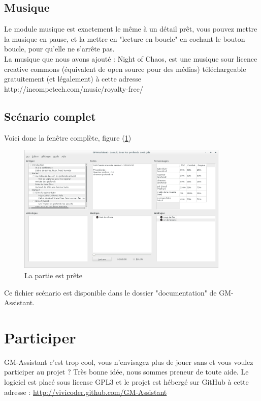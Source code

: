 \documentclass[a4paper,12pt]{article}
\newcommand*{\GMA}{GM-Assistant\xspace}
\begin{document}
\subsection{Musique}
Le module musique est exactement le même à un détail prêt, vous pouvez mettre la musique en pause, et la mettre en "lecture en boucle" en cochant le bouton boucle, pour qu'elle ne s'arrête pas.
\\
La musique que nous avons ajouté : Night of Chaos, est une musique sour licence creative commons (équivalent de open source pour des médias) téléchargeable gratuitement (et légalement) à cette adresse http://incompetech.com/music/royalty-free/

\subsection{Scénario complet}
Voici donc la fenêtre complète, figure (\ref{scenario_complet})
\begin{figure}[h!]
    \includegraphics[width=0.9\textwidth]{scenario_complet}
    \caption{La partie est prête}
    \label{scenario_complet}
\end{figure}

Ce fichier scénario est disponible dans le dossier "documentation" de \GMA.

\section{Participer}\label{participer}
\GMA c'est trop cool, vous n'envisagez plus de jouer sans et vous voulez participer au projet ?
Très bonne idée, nous sommes preneur de toute aide.
Le logiciel est placé sous license GPL3 et le projet est hébergé sur GitHub à cette adresse :
\href{http://vivicoder.github.com/GM-Assistant}{http://vivicoder.github.com/GM-Assistant}
\end{document}
